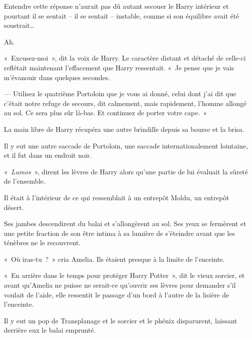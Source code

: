 Entendre cette réponse n'aurait pas dû autant secouer le Harry intérieur et pourtant il se sentait -- il se sentait -- instable, comme si son équilibre avait été soustrait…

Ah.

«~Excusez-moi~», dit la voix de Harry. Le caractère distant et détaché de celle-ci reflétait maintenant l'effacement que Harry ressentait. «~Je pense que je vais m'évanouir dans quelques secondes.

--- Utilisez le quatrième Portoloin que je vous ai donné, celui dont j'ai dit que c'était notre refuge de secours, dit calmement, mais rapidement, l'homme allongé au sol. Ce sera plus sûr là-bas. Et continuez de porter votre cape.~»

La main libre de Harry récupéra une autre brindille depuis sa bourse et la brisa.

Il y eut une autre saccade de Portoloin, une saccade internationalement lointaine, et il fut dans un endroit noir.

«~\emph{Lumos}~», dirent les lèvres de Harry alors qu'une partie de lui évaluait la sûreté de l'ensemble.

Il était à l'intérieur de ce qui ressemblait à un entrepôt Moldu, un entrepôt désert.

Ses jambes descendirent du balai et s'allongèrent au sol. Ses yeux se fermèrent et une petite fraction de son être intima à sa lumière de s'éteindre avant que les ténèbres ne le recouvrent.

\later

«~Où iras-tu~?~» cria Amelia. Ils étaient presque à la limite de l'enceinte.

«~En arrière dans le temps pour protéger Harry Potter~», dit le vieux sorcier, et avant qu'Amelia ne puisse ne serait-ce qu'ouvrir ses lèvres pour demander s'il voulait de l'aide, elle ressentit le passage d'un bord à l'autre de la lisière de l'enceinte.

Il y eut un pop de Transplanage et le sorcier et le phénix disparurent, laissant derrière eux le balai emprunté.
